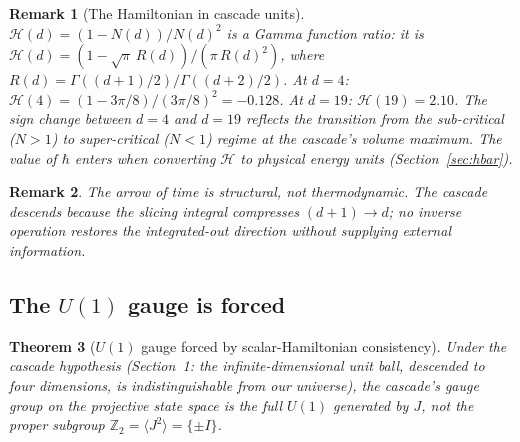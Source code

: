 \documentclass[12pt,a4paper]{article}
\newtheorem{theorem}{Theorem}[section]
\newtheorem{remark}[theorem]{Remark}
\begin{document}
\begin{remark}[The Hamiltonian in cascade units]
$\mathcal{H}(d) = (1-N(d))/N(d)^2$ is a Gamma function ratio: it is $\mathcal{H}(d) =
(1-\sqrt{\pi}\,R(d))/(\pi\,R(d)^2)$, where $R(d) = \Gamma((d+1)/2)/\Gamma((d+2)/2)$.
At $d = 4$: $\mathcal{H}(4) = (1-3\pi/8)/(3\pi/8)^2 = -0.128$. At $d=19$:
$\mathcal{H}(19) = 2.10$. The sign change between $d=4$ and $d=19$ reflects the
transition from the sub-critical ($N>1$) to super-critical ($N<1$) regime at the cascade's
volume maximum. The value of $\hbar$ enters when converting $\mathcal{H}$ to physical
energy units (Section~\ref{sec:hbar}).
\end{remark}

\begin{remark}
The arrow of time is structural, not thermodynamic. The cascade descends because the slicing
integral compresses $(d+1)\to d$; no inverse operation restores the integrated-out direction
without supplying external information.
\end{remark}

\subsection{The \texorpdfstring{$U(1)$}{U(1)} gauge is forced}

\begin{theorem}[$U(1)$ gauge forced by scalar-Hamiltonian consistency]\label{thm:U1-gauge-forced}
Under the cascade hypothesis (Section~1: the infinite-dimensional unit
ball, descended to four dimensions, is indistinguishable from our universe),
the cascade's gauge group on the projective state space is the full $U(1)$
generated by $J$, not the proper subgroup
$\mathbb{Z}_2 = \langle J^2\rangle = \{\pm I\}$.
\end{theorem}
\end{document}
